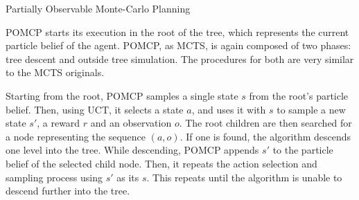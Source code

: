 \begin{algorithm}
    \caption{Partially Observable Monte-Carlo Planning}
\begin{multicols}{2}


    \setcounter{AlgoLine}{0}

    \setcounter{AlgoLine}{0}

\end{multicols}
\end{algorithm}

POMCP starts its execution in the root of the tree, which represents the current particle
belief of the agent. POMCP, as MCTS, is again composed of two phases: tree descent and outside tree
simulation. The procedures for both are very similar to the MCTS originals.

Starting from the root, POMCP samples a single state $s$ from the root's particle belief. Then,
using UCT, it selects a state $a$, and uses it with $s$ to sample a new state $s'$, a reward $r$ and
an observation $o$. The root children are then searched for a node representing the sequence
$(a,o)$. If one is found, the algorithm descends one level into the tree. While descending, POMCP
appends $s'$ to the particle belief of the selected child node. Then, it repeats the action
selection and sampling process using $s'$ as its $s$. This repeats until the algorithm is unable to
descend further into the tree.

